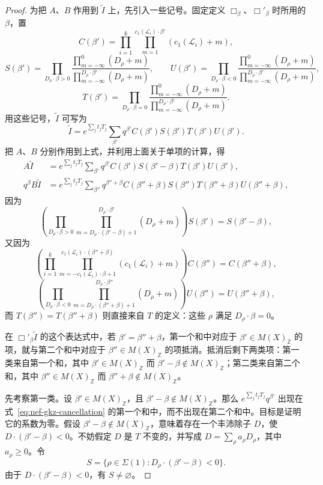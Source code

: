 \begin{proof}
为把 $A$、$B$ 作用到 $\widetilde I$ 上，先引入一些记号。固定定义 $\Box_\beta$、$\Box'_\beta$ 时所用的 $\beta$，置
\[
C(\beta')=\prod_{i=1}^k\prod_{m=1}^{c_1(\mathcal L_i)\cdot\beta'}(c_1(\mathcal L_i)+m),
\]
\[
S(\beta')=\prod_{D_\rho\cdot\beta>0}\frac{\prod_{m=-\infty}^{0}(D_\rho+m)}{\prod_{m=-\infty}^{D_\rho\cdot\beta'}(D_\rho+m)},
\qquad
U(\beta')=\prod_{D_\rho\cdot\beta<0}\frac{\prod_{m=-\infty}^{0}(D_\rho+m)}{\prod_{m=-\infty}^{D_\rho\cdot\beta'}(D_\rho+m)},
\]
\[
T(\beta')=\prod_{D_\rho\cdot\beta=0}\frac{\prod_{m=-\infty}^{0}(D_\rho+m)}{\prod_{m=-\infty}^{D_\rho\cdot\beta'}(D_\rho+m)}.
\]
用这些记号，$\widetilde I$ 可写为
\[
\widetilde I=e^{\sum_jt_jT_j}\sum_{\beta'}q^{\beta'}C(\beta')S(\beta')T(\beta')U(\beta').
\]
把 $A$、$B$ 分别作用到上式，并利用上面关于单项的计算，得
\begin{equation}\label{eq:nef-gkz-cancellation}
\begin{aligned}
A\widetilde I&=e^{\sum_jt_jT_j}\sum_{\beta'}q^{\beta'}C(\beta')S(\beta'-\beta)T(\beta')U(\beta'),\\
q^\beta B\widetilde I&=e^{\sum_jt_jT_j}\sum_{\beta''}q^{\beta''+\beta}C(\beta''+\beta)S(\beta'')T(\beta''+\beta)U(\beta''+\beta),
\end{aligned}
\end{equation}
因为
\[
\left(\prod_{D_\rho\cdot\beta>0}\prod_{m=D_\rho\cdot(\beta'-\beta)+1}^{D_\rho\cdot\beta'}(D_\rho+m)\right)S(\beta')=S(\beta'-\beta),
\]
又因为
\[
\left(\prod_{i=1}^k\prod_{m=-c_1(\mathcal L_i)\cdot\beta+1}^{c_1(\mathcal L_i)\cdot(\beta''+\beta)}(c_1(\mathcal L_i)+m)\right)C(\beta'')=C(\beta''+\beta),
\]
\[
\left(\prod_{D_\rho\cdot\beta<0}\prod_{m=D_\rho\cdot(\beta''+\beta)+1}^{D_\rho\cdot\beta''}(D_\rho+m)\right)U(\beta'')=U(\beta''+\beta),
\]
而 $T(\beta'')=T(\beta''+\beta)$ 则直接来自 $T$ 的定义：这些 $\rho$ 满足 $D_\rho\cdot\beta=0$。

在 $\Box'_\beta\widetilde I$ 的这个表达式中，若 $\beta'=\beta''+\beta$，第一个和中对应于 $\beta'\in M(X)_{\mathbb Z}$ 的项，就与第二个和中对应于 $\beta''\in M(X)_{\mathbb Z}$ 的项抵消。抵消后剩下两类项：第一类来自第一个和，其中 $\beta'\in M(X)_{\mathbb Z}$ 而 $\beta'-\beta\notin M(X)_{\mathbb Z}$；第二类来自第二个和，其中 $\beta''\in M(X)_{\mathbb Z}$ 而 $\beta''+\beta\notin M(X)_{\mathbb Z}$。

先考察第一类。设 $\beta'\in M(X)_{\mathbb Z}$，且 $\beta'-\beta\notin M(X)_{\mathbb Z}$。那么 $e^{\sum_jt_jT_j}q^{\beta'}$ 出现在式~\eqref{eq:nef-gkz-cancellation} 的第一个和中，而不出现在第二个和中。目标是证明它的系数为零。假设 $\beta'-\beta\notin M(X)_{\mathbb Z}$，意味着存在一个丰沛除子 $D$，使 $D\cdot(\beta'-\beta)<0$。不妨假定 $D$ 是 $T$ 不变的，并写成 $D=\sum_\rho a_\rho D_\rho$，其中 $a_\rho\geq0$。令
\[
S=\{\rho\in\Sigma(1):D_\rho\cdot(\beta'-\beta)<0\}.
\]
由于 $D\cdot(\beta'-\beta)<0$，有 $S\ne\varnothing$。


\end{proof}
